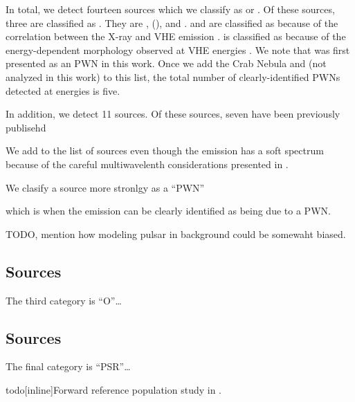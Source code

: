 In total, we detect fourteen sources which we classify as \PWNClass or
\PWNcClass.  Of these sources, three are classified as \PWNClass.  They
are , \mshfifteenfiftytwo (), and .
 and \mshfifteenfiftytwo are classified as \PWNClass
because of the correlation between the X-ray and \ac{VHE} emission
\citep{h.e.s.s.collaboration_2011a_discovery-source,aharonian_2005a_discovery-extended}.
 is classified as \PWNClass because of the
energy-dependent morphology observed at \ac{VHE} energies
\citep{aharonian_2006a_energy-dependent}.  We note that 
was first presented as an \ac{PWN} in this work.  Once we add the Crab
Nebula and \velax (not analyzed in this work) to this list, the total
number of clearly-identified \acp{PWN} detected at \gev energies is five.

In addition, we detect 11 \PWNcClass sources.
Of these sources, seven have been previously publisehd

We add  to the list of \PWNcClass sources even
though the \gev emission has a soft spectrum because of
the careful  multiwavelenth considerations presented in
\cite{lemoine-goumard_2011a_fermi-lat-detection}.


We clasify a source more stronlgy as a ``PWN''

which is when the emission can be clearly
identified as being due to a \ac{PWN}.

TODO, mention how modeling pulsar in background could be somewaht biased.


\subsection{\OtherClass Sources}

The third category is ``O''\ldots

\subsection{\PSRClass Sources}

The final category is ``PSR''\ldots



todo[inline]{Forward reference population study in .}

